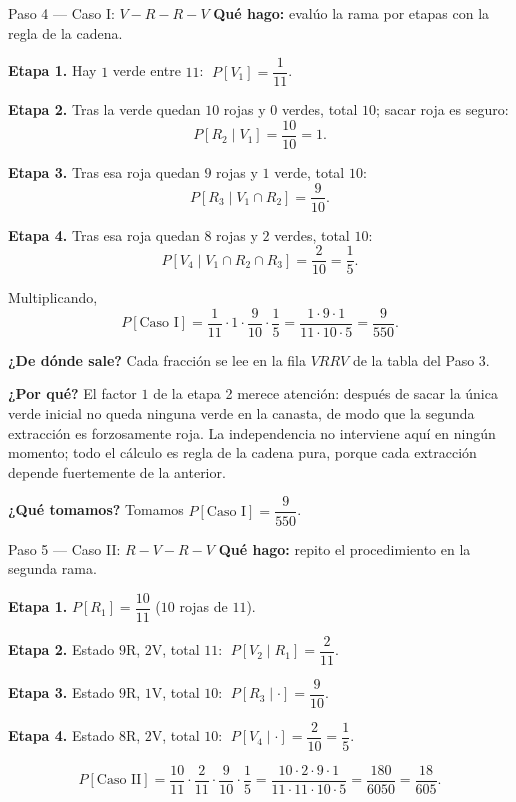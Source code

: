 \documentclass[11pt]{article}
\begin{document}
\begin{sol}
\begin{paso}{Paso 4 --- Caso I: $V\!-\!R\!-\!R\!-\!V$}
\textbf{Qu\'e hago:} eval\'uo la rama por etapas con la regla de la cadena.

\textbf{Etapa 1.} Hay $1$ verde entre $11$: $\;P[V_1]=\dfrac{1}{11}$.

\textbf{Etapa 2.} Tras la verde quedan $10$ rojas y $0$ verdes, total $10$; sacar roja es seguro:
\[
P[R_2\mid V_1]=\frac{10}{10}=1 .
\]

\textbf{Etapa 3.} Tras esa roja quedan $9$ rojas y $1$ verde, total $10$:
\[
P[R_3\mid V_1\cap R_2]=\frac{9}{10}.
\]

\textbf{Etapa 4.} Tras esa roja quedan $8$ rojas y $2$ verdes, total $10$:
\[
P[V_4\mid V_1\cap R_2\cap R_3]=\frac{2}{10}=\frac{1}{5}.
\]

Multiplicando,
\[
P[\text{Caso I}]=\frac{1}{11}\cdot 1\cdot\frac{9}{10}\cdot\frac{1}{5}
=\frac{1\cdot 9\cdot 1}{11\cdot 10\cdot 5}=\frac{9}{550}.
\]

\textbf{¿De d\'onde sale?} Cada fracci\'on se lee en la fila $VRRV$ de la tabla del Paso 3.

\textbf{¿Por qu\'e?} El factor $1$ de la etapa 2 merece atenci\'on: despu\'es de sacar la \'unica verde inicial no queda ninguna verde en la canasta, de modo que la segunda extracci\'on es forzosamente roja. La independencia no interviene aqu\'i en ning\'un momento; todo el c\'alculo es regla de la cadena pura, porque cada extracci\'on depende fuertemente de la anterior.

\textbf{¿Qu\'e tomamos?} Tomamos $P[\text{Caso I}]=\dfrac{9}{550}$.
\end{paso}

\begin{paso}{Paso 5 --- Caso II: $R\!-\!V\!-\!R\!-\!V$}
\textbf{Qu\'e hago:} repito el procedimiento en la segunda rama.

\textbf{Etapa 1.} $P[R_1]=\dfrac{10}{11}$ ($10$ rojas de $11$).

\textbf{Etapa 2.} Estado $9$R, $2$V, total $11$: $\;P[V_2\mid R_1]=\dfrac{2}{11}$.

\textbf{Etapa 3.} Estado $9$R, $1$V, total $10$: $\;P[R_3\mid\cdot]=\dfrac{9}{10}$.

\textbf{Etapa 4.} Estado $8$R, $2$V, total $10$: $\;P[V_4\mid\cdot]=\dfrac{2}{10}=\dfrac{1}{5}$.

\[
P[\text{Caso II}]=\frac{10}{11}\cdot\frac{2}{11}\cdot\frac{9}{10}\cdot\frac{1}{5}
=\frac{10\cdot 2\cdot 9\cdot 1}{11\cdot 11\cdot 10\cdot 5}
=\frac{180}{6050}=\frac{18}{605}.
\]


\end{paso}
\end{sol}
\end{document}
